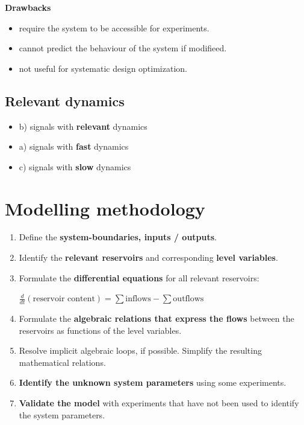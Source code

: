 \documentclass[10pt,a4paper]{scrartcl}
\begin{document}
\begin{multicols*}{3}
\textbf{Drawbacks}
\begin{itemize}
\item require the system to be accessible for experiments.
\item cannot predict the behaviour of the system if modifieed.
\item not useful for systematic design optimization.
\end{itemize}

\columnbreak

\subsection{Relevant dynamics}


\begin{itemize}
\compaq
\item b) signals with \textbf{relevant} dynamics
\item a) signals with \textbf{fast} dynamics
\item c) signals with \textbf{slow} dynamics
\end{itemize}

\vfill
\null
\columnbreak

\section{Modelling methodology}

\begin{enumerate}
\item Define the \textbf{system-boundaries, inputs / outputs}.
\item Identify the \textbf{relevant reservoirs} and corresponding \textbf{level variables}.

\item Formulate the \textbf{differential equations} for all relevant reservoirs:

$\frac{d}{dt}(\text{reservoir content})=\sum\text{inflows}-\sum\text{outflows}$
\item Formulate the \textbf{algebraic relations that express the flows} between the reservoirs as functions of the level variables.
\item Resolve implicit algebraic loops, if possible. Simplify the resulting mathematical relations.
\item \textbf{Identify the unknown system parameters} using some experiments.
\item \textbf{Validate the model} with experiments that have not been used to identify the system parameters.
\end{enumerate}


\end{multicols*}
\end{document}
